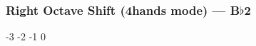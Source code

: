 \subsubsection{Right Octave Shift (4hands mode) --- B$\flat$2}






































-3
-2
-1
0

